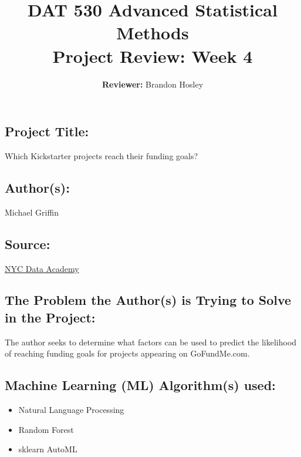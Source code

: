 \documentclass[]{article}
\title{\textbf{DAT 530 Advanced Statistical Methods}\\
	\normalsize{Project Review: Week 4} }
\author{\textbf{Reviewer: }
	Brandon Hosley}
\begin{document}
\setlength{\droptitle}{-10em} 
\pretitle{\begin{flushleft}\LARGE} %
	\posttitle{\end{flushleft}}
\preauthor{\begin{flushleft}\large} %
	\postauthor{\end{flushleft}}
\predate{\begin{flushleft}\large} %
	\postdate{\end{flushleft}}
\maketitle

\vspace{-2em}

\subsection*{Project Title:}
Which Kickstarter projects reach their funding goals?

\subsection*{Author(s):}
Michael Griffin

\subsection*{Source:}
\href{https://nycdatascience.com/blog/student-works/which-kickstarter-projects-reach-their-funding-goals/}{NYC Data Academy}

\subsection*{The Problem the Author(s) is Trying to Solve in the Project:}
The author seeks to determine what factors can be used to predict the likelihood of reaching funding goals for projects appearing on GoFundMe.com.

\subsection*{Machine Learning (ML) Algorithm(s) used:}
\begin{itemize}
	\item Natural Language Processing
	\item Random Forest
	\item sklearn AutoML
\end{itemize}
\end{document}
